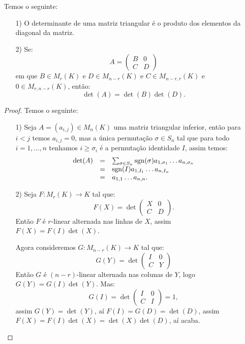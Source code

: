\documentclass[11pt,twoside,a4paper]{book}
\begin{document}
\begin{proposicao}
Temos o seguinte:
\begin{itemize}
\item[1)] O determinante de uma matriz triangular é o produto dos elementos da diagonal da matriz.
\item[2)] Se:
\[
A=\begin{pmatrix}
B&0\\C&D
\end{pmatrix}
\]
em que $B\in M_r(K)$ e $D\in M_{n-r}(K)$ e $C\in M_{n-r,r}(K)$ e $0\in M_{r,n-r}(K)$, então:
\[
\det(A)=\det(B)\det(D).
\]
\end{itemize}
\end{proposicao}
\begin{proof}
Temos o seguinte:
\begin{itemize}
\item[1)] Seja $A=(a_{i,j})\in M_n(K)$ uma matriz triangular inferior, então para $i<j$ temos $a_{i,j}=0$, mas a única permutação $\sigma\in S_n$ tal que para todo $i=1,\dots,n$ tenhamos $i\geq\sigma_i$ é a permutação identidade $I$, assim temos:
\[
\begin{array}{rcl}
\det(A)&=&\sum_{\sigma\in S_n}{\rm sgn}(\sigma)a_{1,\sigma_1}\dots a_{n,\sigma_n}\\
&=&{\rm sgn}(I)a_{1,I_1}\dots a_{n,I_n}\\
&=&a_{1,1}\dots a_{n,n}.
\end{array}
\]
\item[2)] Seja $F:M_r(K)\rightarrow K$ tal que:
\[
F(X)=\det\begin{pmatrix}
X&0\\C&D
\end{pmatrix}.
\]
Então $F$ é $r$-linear alternada nas linhas de $X$, assim $F(X)=F(I)\det(X)$.

\medskip
\noindent
Agora consideremos $G:M_{n-r}(K)\rightarrow K$ tal que:
\[
G(Y)=\det\begin{pmatrix}
I&0\\C&Y
\end{pmatrix}
\]
Então $G$ é $(n-r)$-linear alternada nas colunas de $Y$, logo $G(Y)=G(I)\det(Y)$. Mas:
\[
G(I)=\det\begin{pmatrix}
I&0\\C&I
\end{pmatrix}=1,
\]
assim $G(Y)=\det(Y)$, aí $F(I)=G(D)=\det(D)$, assim $F(X)=F(I)\det(X)=\det(X)\det(D)$, aí acaba.
\end{itemize}
\end{proof}
\end{document}

